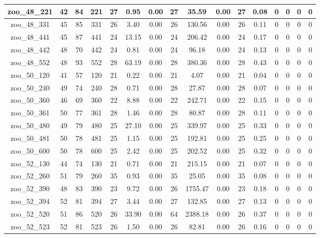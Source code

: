 \begin{landscape}
\begin{longtable}{|c|c|c|c|c|c|c|c|c|c|c|c|c|c|c|c|}
zoo\_48\_221 & 42 & 84 & 221 & 27 & 0.95 & 0.00 & 27 & 35.59 & 0.00 & 27 & 0.08 & 0 & 0 & 0 & 0 \\ \hline 
zoo\_48\_331 & 45 & 85 & 331 & 26 & 3.40 & 0.00 & 26 & 130.56 & 0.00 & 26 & 0.11 & 0 & 0 & 0 & 0 \\ \hline 
zoo\_48\_441 & 45 & 87 & 441 & 24 & 13.15 & 0.00 & 24 & 206.42 & 0.00 & 24 & 0.17 & 0 & 0 & 0 & 0 \\ \hline 
zoo\_48\_442 & 48 & 70 & 442 & 24 & 0.81 & 0.00 & 24 & 96.18 & 0.00 & 24 & 0.13 & 0 & 0 & 0 & 0 \\ \hline 
zoo\_48\_552 & 48 & 93 & 552 & 28 & 63.19 & 0.00 & 28 & 380.36 & 0.00 & 28 & 0.43 & 0 & 0 & 0 & 0 \\ \hline 
zoo\_50\_120 & 41 & 57 & 120 & 21 & 0.22 & 0.00 & 21 & 4.07 & 0.00 & 21 & 0.04 & 0 & 0 & 0 & 0 \\ \hline 
zoo\_50\_240 & 49 & 74 & 240 & 28 & 0.71 & 0.00 & 28 & 27.87 & 0.00 & 28 & 0.07 & 0 & 0 & 0 & 0 \\ \hline 
zoo\_50\_360 & 46 & 69 & 360 & 22 & 8.88 & 0.00 & 22 & 242.71 & 0.00 & 22 & 0.15 & 0 & 0 & 0 & 0 \\ \hline 
zoo\_50\_361 & 50 & 77 & 361 & 28 & 1.46 & 0.00 & 28 & 80.87 & 0.00 & 28 & 0.11 & 0 & 0 & 0 & 0 \\ \hline 
zoo\_50\_480 & 49 & 79 & 480 & 25 & 27.10 & 0.00 & 25 & 339.97 & 0.00 & 25 & 0.33 & 0 & 0 & 0 & 0 \\ \hline 
zoo\_50\_481 & 50 & 78 & 481 & 25 & 1.15 & 0.00 & 25 & 192.81 & 0.00 & 25 & 0.25 & 0 & 0 & 0 & 0 \\ \hline 
zoo\_50\_600 & 50 & 78 & 600 & 25 & 2.42 & 0.00 & 25 & 202.52 & 0.00 & 25 & 0.32 & 0 & 0 & 0 & 0 \\ \hline 
zoo\_52\_130 & 44 & 74 & 130 & 21 & 0.71 & 0.00 & 21 & 215.15 & 0.00 & 21 & 0.07 & 0 & 0 & 0 & 0 \\ \hline 
zoo\_52\_260 & 51 & 79 & 260 & 35 & 0.93 & 0.00 & 35 & 25.05 & 0.00 & 35 & 0.08 & 0 & 0 & 0 & 0 \\ \hline 
zoo\_52\_390 & 48 & 83 & 390 & 23 & 9.72 & 0.00 & 26 & 1755.47 & 0.00 & 23 & 0.18 & 0 & 0 & 0 & 0 \\ \hline 
zoo\_52\_394 & 52 & 81 & 394 & 27 & 3.44 & 0.00 & 27 & 132.85 & 0.00 & 27 & 0.13 & 0 & 0 & 0 & 0 \\ \hline 
zoo\_52\_520 & 51 & 86 & 520 & 26 & 33.90 & 0.00 & 64 & 2388.18 & 0.00 & 26 & 0.37 & 0 & 0 & 0 & 0 \\ \hline 
zoo\_52\_523 & 52 & 81 & 523 & 26 & 1.50 & 0.00 & 26 & 82.81 & 0.00 & 26 & 0.16 & 0 & 0 & 0 & 0 \\ \hline 

\end{longtable}
\end{landscape}
